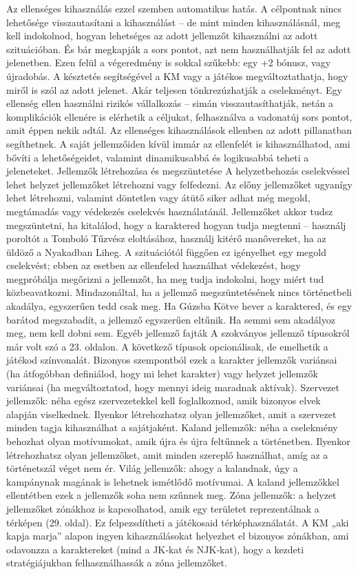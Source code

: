 \documentclass[oneside]{book}
\begin{document}
Az ellenséges kihasználás ezzel szemben automatikus hatás. A célpontnak nincs lehetősége visszautasítani a kihasználást – de mint minden kihasználásnál, meg kell indokolnod, hogyan lehetséges az adott jellemzőt kihasználni az adott szituációban. És bár megkapják a sors pontot, azt nem használhatják fel az adott jelenetben. Ezen felül a végeredmény is sokkal szűkebb: egy +2 bónusz, vagy újradobás.
A késztetés segítségével a KM vagy a játékos megváltoztathatja, hogy miről is szól az adott jelenet. Akár teljesen tönkrezúzhatják a cselekményt. Egy ellenség ellen használni rizikós vállalkozás – simán visszautasíthatják, netán a komplikációk ellenére is elérhetik a céljukat, felhasználva a vadonatúj sors pontot, amit éppen nekik adtál.
Az ellenséges kihasználások ellenben az adott pillanatban segíthetnek. A saját jellemzőiden kívül immár az ellenfelét is kihasználhatod, ami bővíti a lehetőségeidet, valamint dinamikusabbá és logikusabbá teheti a jeleneteket.
Jellemzők létrehozása és megszüntetése
A helyzetbehozás cselekvéssel lehet helyzet jellemzőket létrehozni vagy felfedezni. Az előny jellemzőket ugyanígy lehet létrehozni, valamint döntetlen vagy átütő siker adhat még megold, megtámadás vagy védekezés cselekvés használatánál.
Jellemzőket akkor tudsz megszüntetni, ha kitalálod, hogy a karaktered hogyan tudja megtenni – használj poroltót a Tomboló Tűzvész eloltásához, használj kitérő manővereket, ha az üldöző a Nyakadban Liheg. A szituációtól függően ez igényelhet egy megold cselekvést; ebben az esetben az ellenfeled használhat védekezést, hogy megpróbálja megőrizni a jellemzőt, ha meg tudja indokolni, hogy miért tud közbeavatkozni.
Mindazonáltal, ha a jellemző megszüntetésének nincs történetbeli akadálya, egyszerűen tedd csak meg. Ha Gúzsba Kötve hever a karaktered, és egy barátod megszabadít, a jellemző egyszerűen eltűnik. Ha semmi sem akadályoz meg, nem kell dobni sem.
Egyéb jellemző fajták
A szokványos jellemző típusokról már volt szó a 23. oldalon. A következő típusok opcionálisak, de emelhetik a játékod színvonalát. Bizonyos szempontból ezek a karakter jellemzők variánsai (ha átfogóbban definiálod, hogy mi lehet karakter) vagy helyzet jellemzők variánsai (ha megváltoztatod, hogy mennyi ideig maradnak aktívak).
Szervezet jellemzők: néha egész szervezetekkel kell foglalkoznod, amik bizonyos elvek alapján viselkednek. Ilyenkor létrehozhatsz olyan jellemzőket, amit a szervezet minden tagja kihasználhat a sajátjaként.
Kaland jellemzők: néha a cselekmény behozhat olyan motívumokat, amik újra és újra feltűnnek a történetben. Ilyenkor létrehozhatsz olyan jellemzőket, amit minden szereplő használhat, amíg az a történetszál véget nem ér.
Világ jellemzők: ahogy a kalandnak, úgy a kampánynak magának is lehetnek ismétlődő motívumai. A kaland jellemzőkkel ellentétben ezek a jellemzők soha nem szűnnek meg.
Zóna jellemzők: a helyzet jellemzőket zónákhoz is kapcsolhatod, amik egy területet reprezentálnak a térképen (29. oldal). Ez felpezsdítheti a játékosaid térképhasználatát. A KM „aki kapja marja” alapon ingyen kihasználásokat helyezhet el bizonyos zónákban, ami odavonzza a karaktereket (mind a JK‑kat és NJK‑kat), hogy a kezdeti stratégiájukban felhasználhassák a zóna jellemzőket.
\end{document}
